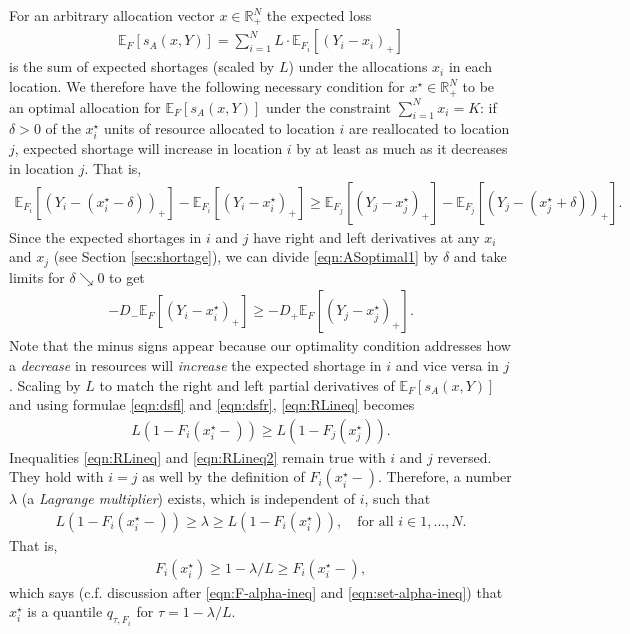 \documentclass{article}\usepackage[]{graphicx}\usepackage[]{xcolor}
\begin{document}
For an arbitrary allocation vector $x \in \mathbb{R}^N_{+}$ the expected loss
\begin{align}
\mathbb{E}_{F} [s_A(x, Y)] = \sum_{i=1}^{N} L \cdot \mathbb{E}_{F_i}[(Y_i - x_i)_{+}] \label{eqn:AS_formula}
\end{align} 
is the sum of expected shortages (scaled by $L$) under the allocations $x_i$ in each location. We therefore
have the following necessary condition for $x^{\star} \in \mathbb{R}^N_{+}$ to be an optimal allocation for $\mathbb
{E}_{F} [s_A(x, Y)]$ under the constraint $\sum_{i=1}^{N} x_i = K$: if $\delta > 0$ of the $x_i^{\star}$ units of resource
allocated to location $i$ are reallocated to location $j$, expected shortage will increase in location
$i$ by at least as much as it decreases in location $j$. That is,
\begin{align}
\mathbb{E}_{F_i}[(Y_i - (x^{\star}_i - \delta))_{+}] - \mathbb{E}_{F_i}[(Y_i - x^{\star}_i)_{+}] \geq 
\mathbb{E}_{F_j}[(Y_j - x^{\star}_j)_{+}] - \mathbb{E}_{F_j}[(Y_j - (x^{\star}_j + \delta))_{+}]. \label{eqn:ASoptimal1}
\end{align}
Since the expected shortages in $i$ and $j$ have right and left derivatives at any $x_i$ and $x_j$ (see Section \ref{sec:shortage}), we can
divide \eqref{eqn:ASoptimal1} by $\delta$ and take limits for $\delta \searrow 0$ to get
\begin{align}
-D_{-} \mathbb{E}_{F} [(Y_i - x^{\star}_i)_{+}] \geq -D_{+}\mathbb{E}_{F} [(Y_j - x^{\star}_j)_{+}]. \label{eqn:RLineq}
\end{align}
Note that the minus signs appear because our optimality condition addresses how a \emph{decrease} in resources will \emph{increase}
the expected shortage in $i$ and vice versa in $j$.
Scaling by $L$ to match the right and left partial derivatives of $\mathbb{E}_{F} [s_A(x, Y)]$ and using formulae \eqref{eqn:dsfl} and \eqref{eqn:dsfr}, \eqref{eqn:RLineq} becomes
\begin{align}
L(1-F_i(x^{\star}_i-)) \geq L(1-F_j(x^{\star}_j)). \label{eqn:RLineq2}
\end{align}
Inequalities \eqref{eqn:RLineq} and \eqref{eqn:RLineq2} remain true with $i$ and $j$ reversed. They hold with $i=j$ as well by the
definition of $F_i(x^{\star}_i-)$. Therefore, a number $\lambda$ (a \emph{Lagrange multiplier}) exists, which is independent of $i$,
such that
\begin{align}
L(1-F_i(x^{\star}_i-)) \geq \lambda \geq L(1-F_i(x^{\star}_i)), \quad \text{for all } i \in 1,\ldots,N.
\end{align}
That is,
\begin{align}
F_i(x^{\star}_i) \geq 1 - \lambda/L \geq F_i(x^{\star}_i-),
\end{align}
which says (c.f. discussion after \eqref{eqn:F-alpha-ineq} and \eqref{eqn:set-alpha-ineq}) that $x^{\star}_i$ is a quantile $q_{\tau,F_i}$ for
$\tau = 1 - \lambda/L$.
\end{document}
